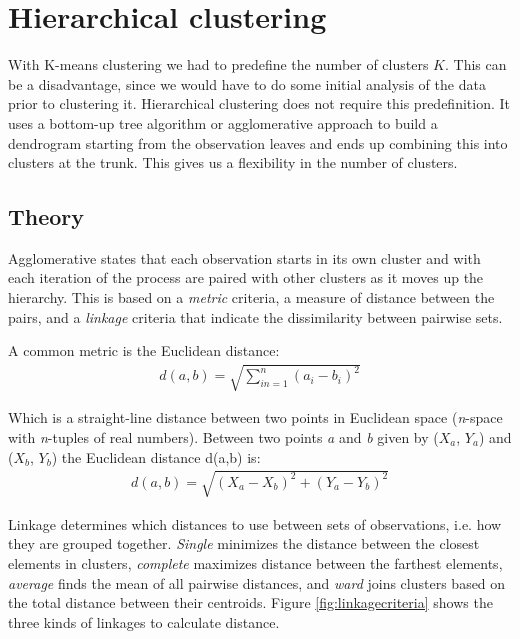 \section{Hierarchical clustering}

With K-means clustering we had to predefine the number of clusters $K$. This can be a disadvantage, since we would have to do some initial analysis of the data prior to clustering it. Hierarchical clustering does not require this predefinition. It uses a bottom-up tree algorithm or agglomerative approach to build a dendrogram starting from the observation leaves and ends up combining this into clusters at the trunk. This gives us a flexibility in the number of clusters.

\subsection{Theory}

Agglomerative states that each observation starts in its own cluster and with each iteration of the process are paired with other clusters as it moves up the hierarchy.  This is based on a \textit{metric} criteria, a measure of distance between the pairs, and a \textit{linkage} criteria that indicate the dissimilarity between pairwise sets.

A common metric is the Euclidean distance:
\begin{align}
	d(a,b) = \sqrt{\sum_{in=1}^{n} (a_{i} - b_{i})^{2}}  
\end{align}

Which is a straight-line distance between two points in Euclidean space (\textit{n}-space with \textit{n}-tuples of real numbers). Between two points \textit{a} and \textit{b} given by ($X_a$, $Y_a$) and ($X_b$, $Y_b$) the Euclidean distance d(a,b) is:
\begin{align}
	d(a,b) = \sqrt{(X_a - X_b)^2 + (Y_a - Y_b)^2}
\end{align}

Linkage determines which distances to use between sets of observations, i.e. how they are grouped together. \textit{Single} minimizes the distance between the closest elements in clusters, \textit{complete} maximizes distance between the farthest elements, \textit{average} finds the mean of all pairwise distances, and \textit{ward} joins clusters based on the total distance between their centroids. Figure \ref{fig:linkagecriteria} shows the three kinds of linkages to calculate distance.

